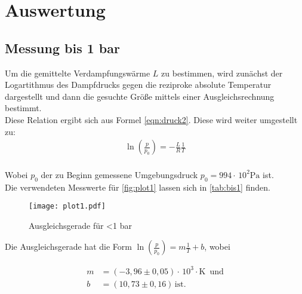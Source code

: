 \section{Auswertung}
\label{sec:Auswertung}

\subsection{Messung bis 1 bar}

  Um die gemittelte Verdampfungswärme $L$ zu bestimmen, wird zunächst der
  Logartithmus des Dampfdrucks gegen die reziproke absolute Temperatur
  dargestellt und dann die gesuchte Größe mittels einer Ausgleichsrechnung
  bestimmt. \\
  Diese Relation ergibt sich aus Formel \ref{eqn:druck2}. Diese wird weiter umgestellt zu:
  \begin{align}
    \label{eqn:druck3}
    \ln\left(\frac{p}{p_0}\right)=- \frac{L}{R} \frac{1}{T}
  \end{align}
  \\
  Wobei $p_0$ der zu Beginn gemessene Umgebungsdruck $p_0 = 994 \cdot \, \mathrm{10^2 Pa}$ ist.
  \\
  Die verwendeten Messwerte für \autoref{fig:plot1} lassen sich in \autoref{tab:bis1} finden.
  \\
  \begin{figure}
    \centering
    \texttt{[image: plot1.pdf]}
    \caption{Ausgleichsgerade für <1 bar}
    \label{fig:plot1}
  \end{figure}

  Die Ausgleichsgerade hat die Form $\ln(\frac{p}{p_0}) = m \frac{1}{T}+b$, wobei

  \begin{align*}
    m &= (-3,96 \pm 0,05) \cdot \, \mathrm{10^3 \cdot K \, \,\, und} \\
    b &= (10,73 \pm 0,16) \, \mathrm{ist.}
  \end{align*}

